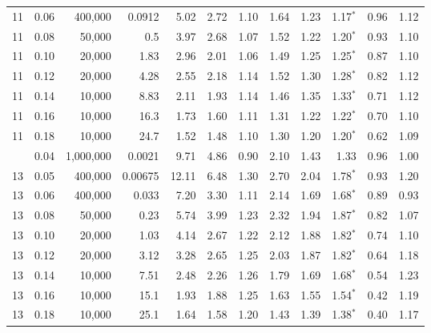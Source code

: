 \documentclass[journal]{IEEEtran}
\begin{document}
\begin{table}[t]
\begin{tabular}{rrrrrrrrrrrr}
11 & 0.06 & 400{,}000 & 0.0912 & 5.02 & 2.72 & 1.10 & 1.64 & 1.23 & 1.17$^{*}$ & 0.96 & 1.12 \\
11 & 0.08 & 50{,}000 & 0.5 & 3.97 & 2.68 & 1.07 & 1.52 & 1.22 & 1.20$^{*}$ & 0.93 & 1.10 \\
11 & 0.10 & 20{,}000 & 1.83 & 2.96 & 2.01 & 1.06 & 1.49 & 1.25 & 1.25$^{*}$ & 0.87 & 1.10 \\
11 & 0.12 & 20{,}000 & 4.28 & 2.55 & 2.18 & 1.14 & 1.52 & 1.30 & 1.28$^{*}$ & 0.82 & 1.12 \\
11 & 0.14 & 10{,}000 & 8.83 & 2.11 & 1.93 & 1.14 & 1.46 & 1.35 & 1.33$^{*}$ & 0.71 & 1.12 \\
11 & 0.16 & 10{,}000 & 16.3 & 1.73 & 1.60 & 1.11 & 1.31 & 1.22 & 1.22$^{*}$ & 0.70 & 1.10 \\
11 & 0.18 & 10{,}000 & 24.7 & 1.52 & 1.48 & 1.10 & 1.30 & 1.20 & 1.20$^{*}$ & 0.62 & 1.09 \\
\addlinespace
13 & 0.04 & 1{,}000{,}000 & 0.0021 & 9.71 & 4.86 & 0.90 & 2.10 & 1.43 & 1.33 & 0.96 & 1.00 \\
13 & 0.05 & 400{,}000 & 0.00675 & 12.11 & 6.48 & 1.30 & 2.70 & 2.04 & 1.78$^{*}$ & 0.93 & 1.20 \\
13 & 0.06 & 400{,}000 & 0.033 & 7.20 & 3.30 & 1.11 & 2.14 & 1.69 & 1.68$^{*}$ & 0.89 & 0.93 \\
13 & 0.08 & 50{,}000 & 0.23 & 5.74 & 3.99 & 1.23 & 2.32 & 1.94 & 1.87$^{*}$ & 0.82 & 1.07 \\
13 & 0.10 & 20{,}000 & 1.03 & 4.14 & 2.67 & 1.22 & 2.12 & 1.88 & 1.82$^{*}$ & 0.74 & 1.10 \\
13 & 0.12 & 20{,}000 & 3.12 & 3.28 & 2.65 & 1.25 & 2.03 & 1.87 & 1.82$^{*}$ & 0.64 & 1.18 \\
13 & 0.14 & 10{,}000 & 7.51 & 2.48 & 2.26 & 1.26 & 1.79 & 1.69 & 1.68$^{*}$ & 0.54 & 1.23 \\
13 & 0.16 & 10{,}000 & 15.1 & 1.93 & 1.88 & 1.25 & 1.63 & 1.55 & 1.54$^{*}$ & 0.42 & 1.19 \\
13 & 0.18 & 10{,}000 & 25.1 & 1.64 & 1.58 & 1.20 & 1.43 & 1.39 & 1.38$^{*}$ & 0.40 & 1.17 \\
\bottomrule
\end{tabular}
\end{table}
\end{document}
